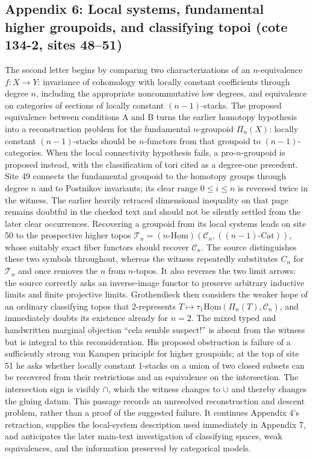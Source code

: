\subsection*{Appendix 6: Local systems, fundamental higher groupoids, and classifying topoi (cote 134-2, sites 48--51)}
The second letter begins by comparing two characterizations of an $n$-equivalence $f:X\to Y$: invariance of cohomology with locally constant coefficients through degree $n$, including the appropriate noncommutative low degrees, and equivalence on categories of sections of locally constant $(n-1)$-stacks. The proposed equivalence between conditions A and B turns the earlier homotopy hypothesis into a reconstruction problem for the fundamental $n$-groupoid $\Pi_n(X)$: locally constant $(n-1)$-stacks should be $n$-functors from that groupoid to $(n-1)$-categories. When the local connectivity hypothesis fails, a pro-$n$-groupoid is proposed instead, with the classification of tori cited as a degree-one precedent. Site 49 connects the fundamental groupoid to the homotopy groups through degree $n$ and to Postnikov invariants; its clear range $0\leq i\leq n$ is reversed twice in the witness. The earlier heavily retraced dimensional inequality on that page remains doubtful in the checked text and should not be silently settled from the later clear occurrences. Recovering a groupoid from its local systems leads on site 50 to the prospective higher topos $\mathcal T_n=(n\text{-}\underline{\mathrm{Hom}})(\mathcal C_n,((n-1)\text{-Cat}))$, whose suitably exact fiber functors should recover $\mathcal C_n$. The source distinguishes these two symbols throughout, whereas the witness repeatedly substitutes $C_n$ for $\mathcal T_n$ and once removes the $n$ from $n$-topos. It also reverses the two limit arrows: the source correctly asks an inverse-image functor to preserve arbitrary inductive limits and finite projective limits. Grothendieck then considers the weaker hope of an ordinary classifying topos that 2-represents $T\mapsto\tau_1\underline{\mathrm{Hom}}(\Pi_n(T),\mathcal C_n)$, and immediately doubts its existence already for $n=2$. The mixed typed and handwritten marginal objection ``cela semble suspect!'' is absent from the witness but is integral to this reconsideration. His proposed obstruction is failure of a sufficiently strong van Kampen principle for higher groupoids; at the top of site 51 he asks whether locally constant 1-stacks on a union of two closed subsets can be recovered from their restrictions and an equivalence on the intersection. The intersection sign is visibly $\cap$, which the witness changes to $\cup$ and thereby changes the gluing datum. This passage records an unresolved reconstruction and descent problem, rather than a proof of the suggested failure. It continues Appendix 4's retraction, supplies the local-system description used immediately in Appendix 7, and anticipates the later main-text investigation of classifying spaces, weak equivalences, and the information preserved by categorical models.

